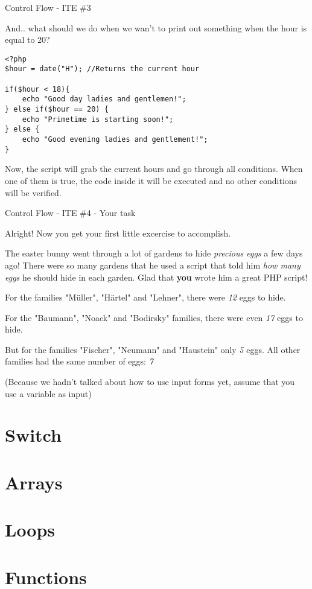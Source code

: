 \begin{frame}[fragile]{Control Flow - ITE \#{}3}

And.. what should we do when we wan't to print out something when the hour is equal to 20? \pause
\begin{lstlisting}
<?php
$hour = date("H"); //Returns the current hour

if($hour < 18){
	echo "Good day ladies and gentlemen!";
} else if($hour == 20) {
    echo "Primetime is starting soon!";
} else {
    echo "Good evening ladies and gentlement!";
}
\end{lstlisting} 
\pause

Now, the script will grab the current hours and go through all conditions. When one of them is true, the code inside it will be executed and no other conditions will be verified.
\end{frame}

\begin{frame}[fragile]{Control Flow - ITE \#{}4 - Your task}

Alright! Now you get your first little excercise to accomplish. \pause

The easter bunny went through a lot of gardens to hide \emph{precious eggs} a few days ago! There were so many gardens that he used a script that told him \emph{how many eggs} he should hide in each garden. Glad that \textbf{you} wrote him a great PHP script!

For the families "Müller", "Härtel" and "Lehner", there were \emph{12} eggs to hide. 

For the "Baumann", "Noack" and "Bodirsky" families, there were even \emph{17} eggs to hide.

But for the families "Fischer", "Neumann" and "Haustein" only \emph{5} eggs. All other families had the same number of eggs: \emph{7}

(Because we hadn't talked about how to use input forms yet, assume that you use a variable as input) 
\end{frame}

\section{Switch}
\section{Arrays}
\section{Loops}
\section{Functions}


